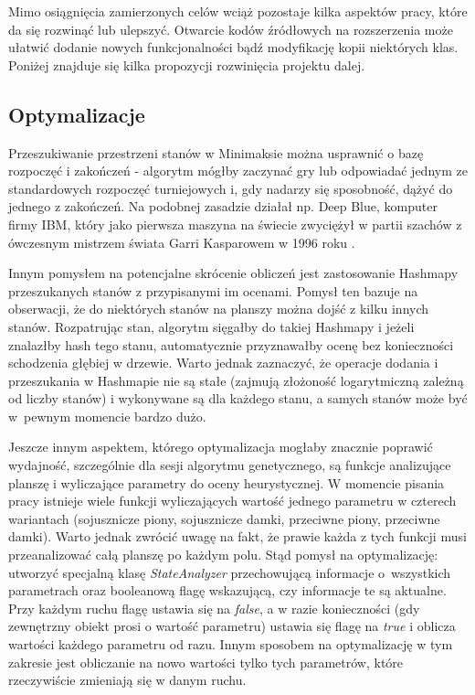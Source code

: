 Mimo osiągnięcia zamierzonych celów wciąż pozostaje kilka aspektów pracy, które da się rozwinąć lub ulepszyć. Otwarcie kodów źródłowych na rozszerzenia może ułatwić dodanie nowych funkcjonalności bądź modyfikację kopii niektórych klas. Poniżej znajduje się kilka propozycji rozwinięcia projektu dalej.

\subsection{Optymalizacje}

Przeszukiwanie przestrzeni stanów w Minimaksie można usprawnić o bazę rozpoczęć i zakończeń - algorytm mógłby zaczynać gry lub odpowiadać jednym ze standardowych rozpoczęć turniejowych i, gdy nadarzy się sposobność, dążyć do jednego z zakończeń. Na podobnej zasadzie działał np. Deep Blue, komputer firmy IBM, który jako pierwsza maszyna na świecie zwyciężył w partii szachów z ówczesnym mistrzem świata Garri Kasparowem w 1996 roku \cite{RBA-SI}.

Innym pomysłem na potencjalne skrócenie obliczeń jest zastosowanie Hashmapy przeszukanych stanów z przypisanymi im ocenami. Pomysł ten bazuje na obserwacji, że do niektórych stanów na planszy można dojść z kilku innych stanów. Rozpatrując stan, algorytm sięgałby do takiej Hashmapy i jeżeli znalazłby hash tego stanu, automatycznie przyznawałby ocenę bez konieczności schodzenia głębiej w drzewie. Warto jednak zaznaczyć, że operacje dodania i przeszukania w Hashmapie nie są stałe (zajmują złożoność logarytmiczną zależną od liczby stanów) i wykonywane są dla każdego stanu, a samych stanów może być w~pewnym momencie bardzo dużo.

Jeszcze innym aspektem, którego optymalizacja mogłaby znacznie poprawić wydajność, szczególnie dla sesji algorytmu genetycznego, są funkcje analizujące planszę i wyliczające parametry do oceny heurystycznej. W momencie pisania pracy istnieje wiele funkcji wyliczających wartość jednego parametru w czterech wariantach (sojusznicze piony, sojusznicze damki, przeciwne piony, przeciwne damki). Warto jednak zwrócić uwagę na fakt, że prawie każda z tych funkcji musi przeanalizować całą planszę po każdym polu. Stąd pomysł na optymalizację: utworzyć specjalną klasę \textit{StateAnalyzer} przechowującą informacje o~wszystkich parametrach oraz booleanową flagę wskazującą, czy informacje te są aktualne. Przy każdym ruchu flagę ustawia się na \textit{false}, a w razie konieczności (gdy zewnętrzny obiekt prosi o wartość parametru) ustawia się flagę na \textit{true} i oblicza wartości każdego parametru od razu. Innym sposobem na optymalizację w tym zakresie jest obliczanie na nowo wartości tylko tych parametrów, które rzeczywiście zmieniają się w danym ruchu.

